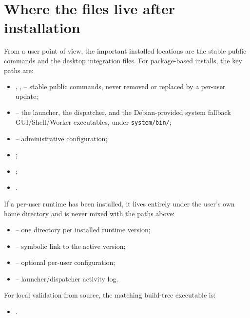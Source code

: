 \section{Where the files live after installation}
\label{sec:user-installation-file-locations}

From a user point of view, the important installed locations are the stable
public commands and the desktop integration files. For package-based
installs, the key paths are:
\begin{itemize}
\item {}, ,
   -- stable public commands, never removed or
  replaced by a per-user update;
\item {} -- the launcher, the dispatcher, and the
  Debian-provided system fallback GUI/Shell/Worker executables, under
  \texttt{system/bin/};
\item {} -- administrative configuration;
\item {};
\item {};
\item {}.
\end{itemize}

If a per-user runtime has been installed, it lives entirely under the user's
own home directory and is never mixed with the paths above:
\begin{itemize}
\item {} -- one directory per
  installed runtime version;
\item {} -- symbolic link to the active
  version;
\item {} -- optional per-user
  configuration;
\item {} -- launcher/dispatcher activity
  log.
\end{itemize}

For local validation from source, the matching build-tree executable is:
\begin{itemize}
\item {}.
\end{itemize}

